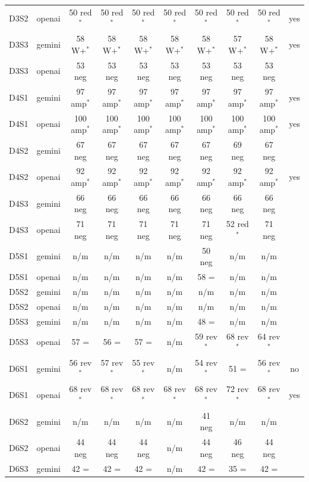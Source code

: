 \begin{table}[t]
{\begin{tabular}{@{}llcccccccc@{}}
D3S2 & openai & 50 red$^{*}$ & 50 red$^{*}$ & 50 red$^{*}$ & 50 red$^{*}$ & 50 red$^{*}$ & 50 red$^{*}$ & 50 red$^{*}$ & yes \\
D3S3 & gemini & 58 W+$^{*}$ & 58 W+$^{*}$ & 58 W+$^{*}$ & 58 W+$^{*}$ & 58 W+$^{*}$ & 57 W+$^{*}$ & 58 W+$^{*}$ & yes \\
D3S3 & openai & 53 neg & 53 neg & 53 neg & 53 neg & 53 neg & 53 neg & 53 neg &  \\
D4S1 & gemini & 97 amp$^{*}$ & 97 amp$^{*}$ & 97 amp$^{*}$ & 97 amp$^{*}$ & 97 amp$^{*}$ & 97 amp$^{*}$ & 97 amp$^{*}$ & yes \\
D4S1 & openai & 100 amp$^{*}$ & 100 amp$^{*}$ & 100 amp$^{*}$ & 100 amp$^{*}$ & 100 amp$^{*}$ & 100 amp$^{*}$ & 100 amp$^{*}$ & yes \\
D4S2 & gemini & 67 neg & 67 neg & 67 neg & 67 neg & 67 neg & 69 neg & 67 neg &  \\
D4S2 & openai & 92 amp$^{*}$ & 92 amp$^{*}$ & 92 amp$^{*}$ & 92 amp$^{*}$ & 92 amp$^{*}$ & 92 amp$^{*}$ & 92 amp$^{*}$ & yes \\
D4S3 & gemini & 66 neg & 66 neg & 66 neg & 66 neg & 66 neg & 66 neg & 66 neg &  \\
D4S3 & openai & 71 neg & 71 neg & 71 neg & 71 neg & 71 neg & 52 red$^{*}$ & 71 neg &  \\
D5S1 & gemini & n/m & n/m & n/m & n/m & 50 neg & n/m & n/m &  \\
D5S1 & openai & n/m & n/m & n/m & n/m & 58 = & n/m & n/m &  \\
D5S2 & gemini & n/m & n/m & n/m & n/m & n/m & n/m & n/m &  \\
D5S2 & openai & n/m & n/m & n/m & n/m & n/m & n/m & n/m &  \\
D5S3 & gemini & n/m & n/m & n/m & n/m & 48 = & n/m & n/m &  \\
D5S3 & openai & 57 = & 56 = & 57 = & n/m & 59 rev$^{*}$ & 68 rev$^{*}$ & 64 rev$^{*}$ &  \\
D6S1 & gemini & 56 rev$^{*}$ & 57 rev$^{*}$ & 55 rev$^{*}$ & n/m & 54 rev$^{*}$ & 51 = & 56 rev$^{*}$ & no \\
D6S1 & openai & 68 rev$^{*}$ & 68 rev$^{*}$ & 68 rev$^{*}$ & 68 rev$^{*}$ & 68 rev$^{*}$ & 72 rev$^{*}$ & 68 rev$^{*}$ & yes \\
D6S2 & gemini & n/m & n/m & n/m & n/m & 41 neg & n/m & n/m &  \\
D6S2 & openai & 44 neg & 44 neg & 44 neg & n/m & 44 neg & 46 neg & 44 neg &  \\
D6S3 & gemini & 42 = & 42 = & 42 = & n/m & 42 = & 35 = & 42 = &  \\

\end{tabular}}
\end{table}
